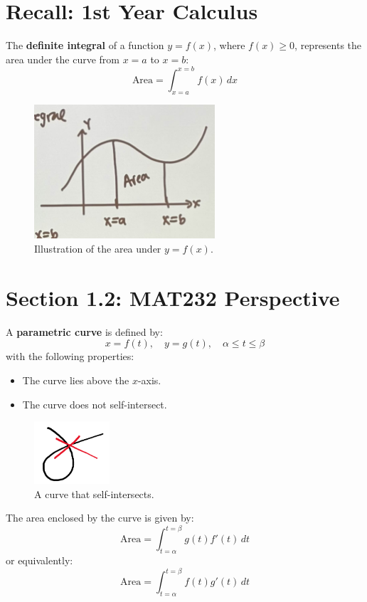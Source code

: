 \documentclass{article}
\begin{document}
\section*{Recall: 1st Year Calculus}
\begin{definitionbox}
The \textbf{definite integral} of a function \( y = f(x) \), where \( f(x) \geq 0 \), represents the area under the curve from \( x = a \) to \( x = b \):
\[
    \text{Area} = \int_{x=a}^{x=b} f(x) \, dx
\]
\begin{figure}[H]
    \centering
    \includegraphics[width=0.6\textwidth]{1styearcalc.jpg}
    \caption{Illustration of the area under \( y = f(x) \).}
    \label{fig:sample_image}
\end{figure}
\end{definitionbox}

\section*{Section 1.2: MAT232 Perspective}
\begin{definitionbox}
A \textbf{parametric curve} is defined by:
\[
    x = f(t), \quad y = g(t), \quad \alpha \leq t \leq \beta
\]
with the following properties:
\begin{itemize}
    \item The curve lies above the \( x \)-axis.
    \item The curve does not self-intersect.
\end{itemize}
\begin{figure}[H]
    \centering
    \includegraphics[width=0.25\textwidth]{self_intersecting_parametric_curve_example.png}
    \caption{A curve that self-intersects.}
    \label{fig:sample_image}
\end{figure}

The area enclosed by the curve is given by:
\[
    \text{Area} = \int_{t=\alpha}^{t=\beta} g(t) f'(t) \, dt
\]
or equivalently:
\[
    \text{Area} = \int_{t=\alpha}^{t=\beta} f(t) g'(t) \, dt
\]
\end{definitionbox}
\end{document}

